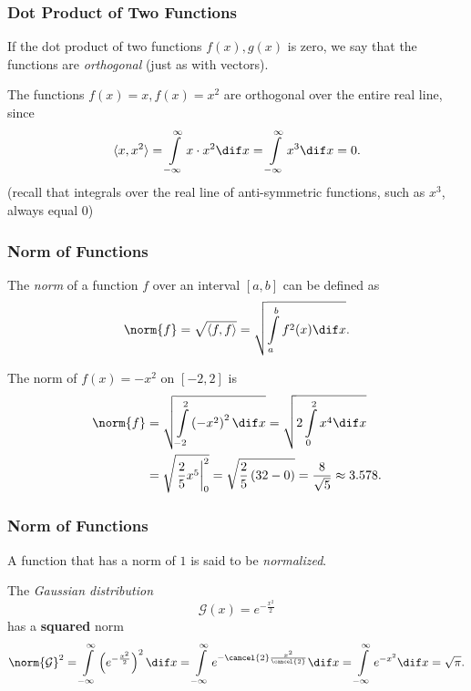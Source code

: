 \begin{frame}
	\frametitle{Dot Product of Two Functions}
	If the dot product of two functions $f(x), g(x)$ is zero, we say that the functions are \emph{orthogonal} (just as with vectors).

	\begin{presentation_example}
		The functions $f(x)=x, f(x)=x^{2}$ are orthogonal over the entire real line, since
		\begin{equation*}
			\langle x, x^{2} \rangle = \int\limits_{-\infty}^{\infty} x\cdot x^{2} \dif x = \int\limits_{-\infty}^{\infty}x^{3} \dif x = 0.
		\end{equation*}
		(recall that integrals over the real line of anti-symmetric functions, such as $x^{3}$, always equal $0$)
	\end{presentation_example}
\end{frame}

\begin{frame}
	\frametitle{Norm of Functions}
	The \emph{norm} of a function $f$ over an interval $\left[ a,b \right]$ can be defined as
	\begin{equation*}
		\norm{f} = \sqrt{\langle f, f \rangle} = \sqrt{\int\limits_{a}^{b} f^{2}(x) \dif x}.
	\end{equation*}

	\begin{presentation_example}
		The norm of $f(x)=-x^{2}$ on $\left[ -2,2 \right]$ is
		\begin{align*}
			\norm{f} &= \sqrt{\int\limits_{-2}^{2} \left(-x^{2}\right)^{2} \dif x} = \sqrt{2\int\limits_{0}^{2} x^{4} \dif x}\\
			&= \sqrt{\left.\frac{2}{5}x^{5}\right|_{0}^{2}} = \sqrt{\frac{2}{5}\left( 32 - 0 \right)} = \frac{8}{\sqrt{5}} \approx 3.578.
		\end{align*}
	\end{presentation_example}
\end{frame}

\begin{frame}
	\frametitle{Norm of Functions}
	A function that has a norm of $1$ is said to be \emph{normalized}.

	\begin{presentation_example}
		The \emph{Gaussian distribution}
		\begin{equation*}
			\mathcal{G}(x) = e^{-\frac{x^{2}}{2}}
		\end{equation*}
		has a \textbf{squared} norm
		\begin{align*}
			\norm{\mathcal{G}}^{2} &= \int\limits_{-\infty}^{\infty}\left(e^{-\frac{x^{2}}{2}}\right)^{2}\dif x = \int\limits_{-\infty}^{\infty}e^{-\cancel{2}\frac{x^{2}}{\cancel{2}}}\dif x = \int\limits_{-\infty}^{\infty}e^{-x^{2}}\dif x = \sqrt{\pi}.\\
		\end{align*}
	\end{presentation_example}
\end{frame}
